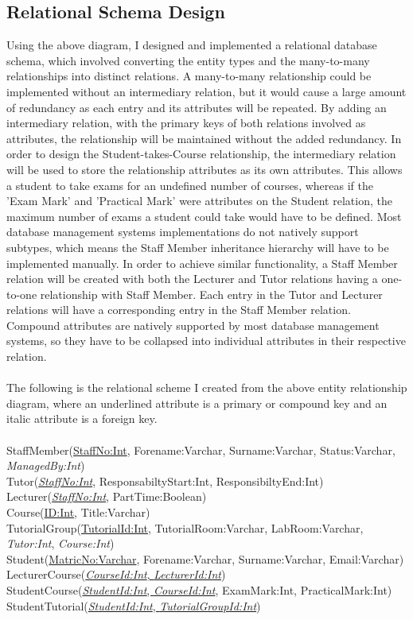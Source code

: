 \documentclass[12pt]{article}
\begin{document}
\subsection{Relational Schema Design}
Using the above diagram, I designed and implemented a relational database schema, which involved converting the entity types and the many-to-many relationships into distinct relations.
A many-to-many relationship could be implemented without an intermediary relation, but it would cause a large amount of redundancy as each entry and its attributes will be repeated.
By adding an intermediary relation, with the primary keys of both relations involved as attributes, the relationship will be maintained without the added redundancy.
In order to design the Student-takes-Course relationship, the intermediary relation will be used to store the relationship attributes as its own attributes.
This allows a student to take exams for an undefined number of courses, whereas if the 'Exam Mark' and 'Practical Mark' were attributes on the Student relation, the maximum number of exams a student could take would have to be defined.
Most database management systems implementations do not natively support subtypes, which means the Staff Member inheritance hierarchy will have to be implemented manually.
In order to achieve similar functionality, a Staff Member relation will be created with both the Lecturer and Tutor relations having a one-to-one relationship with Staff Member.
Each entry in the Tutor and Lecturer relations will have a corresponding entry in the Staff Member relation.
Compound attributes are natively supported by most database management systems, so they have to be collapsed into individual attributes in their respective relation.
\\
\\
The following is the relational scheme I created from the above entity relationship diagram, where an underlined attribute is a primary or compound key and an italic attribute is a foreign key.\\\\
StaffMember(\underline{StaffNo:Int}, Forename:Varchar, Surname:Varchar, Status:Varchar, \textit{ManagedBy:Int})\\
Tutor(\underline{\textit{StaffNo:Int}}, ResponsabiltyStart:Int, ResponsibiltyEnd:Int)\\
Lecturer(\underline{\textit{StaffNo:Int}}, PartTime:Boolean)\\
Course(\underline{ID:Int}, Title:Varchar)\\
TutorialGroup(\underline{TutorialId:Int}, TutorialRoom:Varchar, LabRoom:Varchar, \textit{Tutor:Int}, \textit{Course:Int})\\
Student(\underline{MatricNo:Varchar}, Forename:Varchar, Surname:Varchar, Email:Varchar)\\
LecturerCourse(\underline{\textit{CourseId:Int}, \textit{LecturerId:Int}})\\
StudentCourse(\underline{\textit{StudentId:Int}, \textit{CourseId:Int}}, ExamMark:Int, PracticalMark:Int)\\
StudentTutorial(\underline{\textit{StudentId:Int}, \textit{TutorialGroupId:Int}})\\
\end{document}
